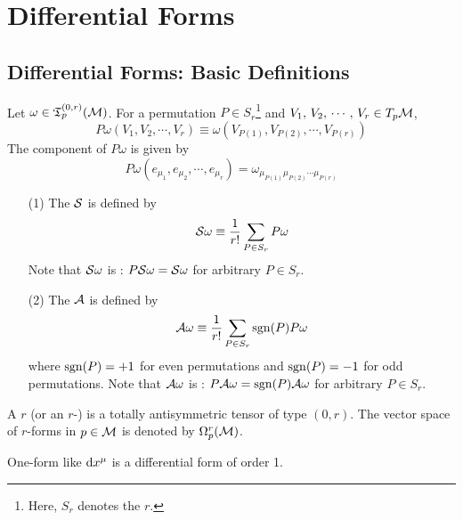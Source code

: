 \documentclass[a4paper, 10pt]{article}
\begin{document}
\setcounter{section}{6}
\section{Differential Forms}

\subsection{Differential Forms: Basic Definitions}

\begin{definition}[Permutation]
    Let $\omega \in \mathfrak{T}^{(0,r)}_{p}(\mathcal{M})$. For a permutation $P \in S_{r}$\footnote{Here, $S_{r}$ denotes the  $r$.} and $V_{1},\,V_{2},\,\cdots,\,V_{r} \in T_{p}\mathcal{M}$,
    \[ P\omega(V_{1},V_{2},\cdots,V_{r}) \equiv \omega(V_{P(1)},V_{P(2)},\cdots,V_{P(r)}) \]
    The component of $P\omega$ is given by
    \[ P\omega(e_{\mu_{1}},e_{\mu_{2}},\cdots,e_{\mu_{r}}) = \omega_{\mu_{P(1)}\mu_{P(2)}\cdots\mu_{P(r)}} \]
\end{definition}

\begin{definition}
    \hphantom{.}
    \begin{itemize}
        \item[(1)] The  $\mathcal{S}$ is defined by 
        \[ \mathcal{S}\omega \equiv \frac{1}{r!}\sum_{P \in S_{r}} P\omega \]
        Note that $\mathcal{S}\omega$ is : $P\mathcal{S}\omega = \mathcal{S}\omega$ for arbitrary $P \in S_{r}$.
        \item[(2)] The  $\mathcal{A}$ is defined by 
        \[ \mathcal{A}\omega \equiv \frac{1}{r!}\sum_{P \in S_{r}} \mathrm{sgn}(P)P\omega \]
        where $\mathrm{sgn}(P) = +1$ for even permutations and $\mathrm{sgn}(P) = -1$ for odd permutations. Note that $\mathcal{A}\omega$ is : $P\mathcal{A}\omega = \mathrm{sgn}(P)\mathcal{A}\omega$ for arbitrary $P \in S_{r}$.
    \end{itemize}
\end{definition}

\seprule

\begin{definition}
    A  $r$ (or an $r$-) is a totally antisymmetric tensor of type $(0,r)$. The vector space of $r$-forms in $p \in \mathcal{M}$ is denoted by $\Omega_{p}^{r}(\mathcal{M})$.
\end{definition}
\begin{remark}
    One-form like $\mathrm{d}{x}^{\mu}$ is a differential form of order 1.
\end{remark}
\end{document}
